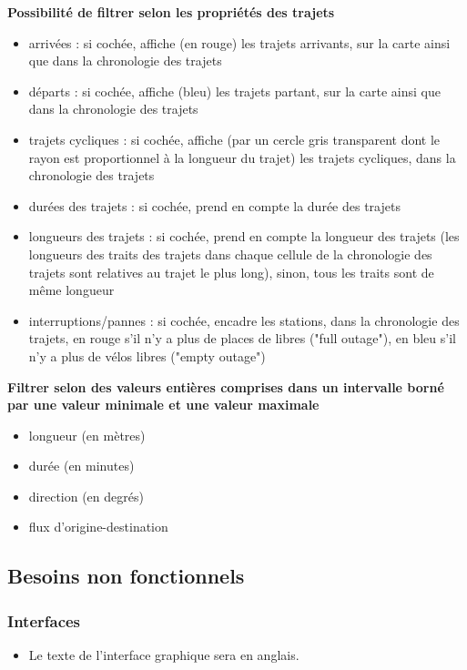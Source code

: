 \documentclass[12pt]{article}
\begin{document}
				\textbf{Possibilité de filtrer selon les propriétés des trajets}\par
					\begin{itemize}
						\item arrivées : si cochée, affiche (en rouge) les trajets arrivants, sur la carte ainsi que dans la chronologie des trajets
						\item départs : si cochée, affiche (bleu) les trajets partant, sur la carte ainsi que dans la chronologie des trajets
						\item trajets cycliques : si cochée, affiche (par un cercle gris transparent dont le rayon est proportionnel à la longueur du trajet) les trajets cycliques, dans la chronologie des trajets
						\item durées des trajets : si cochée, prend en compte la durée des trajets
						\item longueurs des trajets : si cochée, prend en compte la longueur des trajets (les longueurs des traits des trajets dans chaque cellule de la chronologie des trajets sont relatives au trajet le plus long), sinon, tous les  traits sont de même longueur
						\item interruptions/pannes : si cochée, encadre les stations, dans la chronologie des trajets, en rouge s'il n'y a plus de places de libres ("full outage"), en bleu s'il n'y a plus de vélos libres ("empty outage")\\
					\end{itemize}

				\textbf{Filtrer selon des valeurs entières comprises dans un intervalle borné par une valeur minimale et une valeur maximale}\par
					\begin{itemize}
						\item longueur (en mètres)
						\item durée (en minutes)
						\item direction (en degrés)
						\item flux d'origine-destination
					\end{itemize}

		\subsection{Besoins non fonctionnels}
			\subsubsection{Interfaces}
				\begin{itemize}
					\item Le texte de l'interface graphique sera en anglais.
				\end{itemize}
\end{document}
